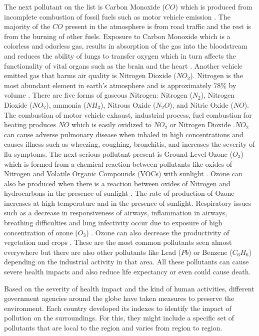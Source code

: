 The next pollutant on the list is Carbon Monoxide ($CO$) which is produced from incomplete combustion of fossil fuels such as motor vehicle emission \cite{Payus2019}. The majority of the $CO$ present in the atmosphere is from road traffic and the rest is from the burning of other fuels\cite{Payus2019}. Exposure to Carbon Monoxide which is a colorless and odorless gas, results in absorption of the gas into the bloodstream and reduces the ability of lungs to transfer oxygen which in turn affects the functionality of vital organs such as the brain and the heart \cite{Sierra-vargas2012} \cite{Golbabaei2012}. Another vehicle emitted gas that harms air quality is Nitrogen Dioxide ($NO_2$). Nitrogen is the most abundant element in earth's atmosphere and is approximately 78\% by volume \cite{EnvironmentalQualitySectionMoE2012}. There are five forms of gaseous Nitrogen: Nitrogen (${N_2}$), Nitrogen Dioxide ($NO_2$), ammonia ($NH_3$), Nitrous Oxide ($N_2O$), and Nitric Oxide ($NO$). The combustion of motor vehicle exhaust, industrial process, fuel combustion for heating produces $NO$ which is easily oxidized to $NO_2$ or Nitrogen Dioxide \cite{EnvironmentalQualitySectionMoE2012}.$NO_2$ can cause adverse pulmonary disease when inhaled in high concentrations and causes illness such as wheezing, coughing, bronchitis, and increases the severity of flu symptoms\cite{Salonen2019}. The next serious pollutant present is Ground Level Ozone ($O_3$) which is formed from a chemical reaction between pollutants like oxides of Nitrogen and Volatile Organic Compounds (VOCs) with sunlight \cite{EPA2018}. Ozone can also be produced when there is a reaction between oxides of Nitrogen and hydrocarbons in the presence of sunlight \cite{Environment2016}.  The rate of production of Ozone increases at high temperature and in the presence of sunlight. Respiratory issues such as a decrease in responsiveness of airways, inflammation in airways, breathing difficulties and lung infectivity occur due to exposure of high concentration of ozone ($O_3$) \cite{Lippmann1989}. Ozone can also decrease the productivity of vegetation and crops \cite{cukor2015bridging}. These are the most common pollutants seen almost everywhere but there are also other pollutants like Lead ($Pb$) or Benzene ($C_{6}H_{6}$) depending on the industrial activity in that area. All these pollutants can cause severe health impacts and also reduce life expectancy or even could cause death.

Based on the severity of health impact and the kind of human activities, different government agencies around the globe have taken measures to preserve the environment. Each country developed its indexes to identify the impact of pollution on the surroundings. For this, they might include a specific set of pollutants that are local to the region and varies from region to region.

